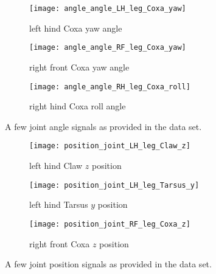 \begin{figure}[H]
	\begin{subfigure}[h]{0.6\textwidth}
		\begin{center}
			\texttt{[image: angle\_angle\_LH\_leg\_Coxa\_yaw]}
			\caption{left hind Coxa yaw angle}
			\label{fig::lh_coxa_yaw}
		\end{center}
	\end{subfigure}
	
	\begin{subfigure}[h]{0.6\textwidth}
		\begin{center}
			\texttt{[image: angle\_angle\_RF\_leg\_Coxa\_yaw]}
			\caption{right front Coxa yaw angle}
		\end{center}
	\end{subfigure}
	
	\begin{subfigure}[h]{0.6\textwidth}
		\begin{center}
			\texttt{[image: angle\_angle\_RH\_leg\_Coxa\_roll]}
			\caption{right hind Coxa roll angle}
		\end{center}
	\end{subfigure}
	\caption{A few joint angle signals as provided in the data set.}
	\label{fig::joint_angle}
\end{figure}

\begin{figure}[H]
	\begin{subfigure}[h]{0.6\textwidth}
		\begin{center}
			\texttt{[image: position\_joint\_LH\_leg\_Claw\_z]}
			\caption{left hind Claw $z$ position}
			\label{fig::lh_claw_z}
		\end{center}
	\end{subfigure}
	
	\begin{subfigure}[h]{0.6\textwidth}
		\begin{center}
			\texttt{[image: position\_joint\_LH\_leg\_Tarsus\_y]}
			\caption{left hind Tarsus $y$ position}
			\label{fig::lh_tarsus_y}
		\end{center}
	\end{subfigure}
	
	\begin{subfigure}[h]{0.6\textwidth}
		\begin{center}
			\texttt{[image: position\_joint\_RF\_leg\_Coxa\_z]}
			\caption{right front Coxa $z$ position}
			\label{fig::rf_coxa_z}
		\end{center}
	\end{subfigure}
	\caption{A few joint position signals as provided in the data set.}
	\label{fig::joint_position}
\end{figure}

